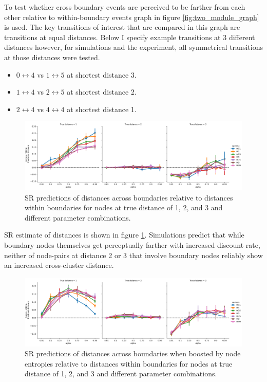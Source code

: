 To test whether cross boundary events are perceived to be farther from each other relative to within-boundary events graph in figure \ref{fig:two_module_graph} is used. The key transitions of interest that are compared in this graph are transitions at equal distances. Below I specify example transitions at 3 different distances however, for simulations and the experiment, all symmetrical transitions at those distances were tested. 
\begin{itemize}
    \item $0 \leftrightarrow 4$ vs $1 \leftrightarrow 5$ at shortest distance 3. 
    \item $1 \leftrightarrow 4$ vs $2 \leftrightarrow 5$ at shortest distance 2. 
    \item $2 \leftrightarrow 4$ vs $4 \leftrightarrow 4$ at shortest distance 1. 
\end{itemize}

\begin{figure}
    \centering
    \label{fig:SR-distance-estimate}
    \includegraphics[width = \textwidth]{chapter_notebooks/chapter_3/figures/distance_predictions.png}
    \caption{SR predictions of distances across boundaries relative to distances within boundaries for nodes at true distance of 1, 2, and 3 and different parameter combinations.}
\end{figure}

SR estimate of distances is shown in figure \ref{fig:SR-distance-estimate}. Simulations predict that while boundary nodes themselves get perceptually farther with increased discount rate, neither of node-pairs at distance 2 or 3 that involve boundary nodes reliably show an increased cross-cluster distance.

\begin{figure}
    \centering
    \label{fig:SR-distance-estimate-entropy-boost}
    \includegraphics[width = \textwidth]{chapter_notebooks/chapter_3/figures/distance_predictions_entropyboost.png}
    \caption{SR predictions of distances across boundaries when boosted by node entropies relative to distances within boundaries for nodes at true distance of 1, 2, and 3 and different parameter combinations.}
\end{figure}

